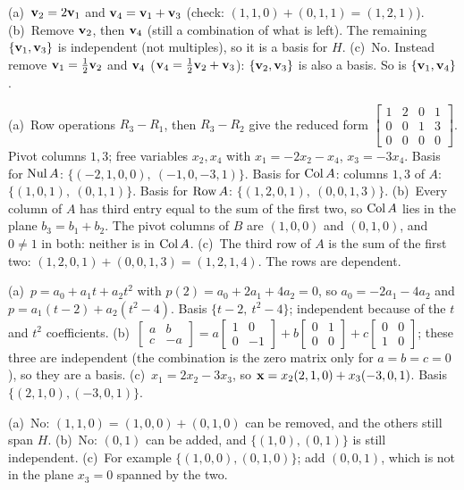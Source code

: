 \documentclass[11pt]{article}
\begin{document}
\begin{description}[leftmargin=0pt,itemsep=5pt]
  \item[Knowledge Check \ref{kc:shrinkkc}.] (a)~$\mathbf{v}_2=2\mathbf{v}_1$ and $\mathbf{v}_4=\mathbf{v}_1+\mathbf{v}_3$ (check: $(1,1,0)+(0,1,1)=(1,2,1)$). (b)~Remove $\mathbf{v}_2$, then $\mathbf{v}_4$ (still a combination of what is left). The remaining $\{\mathbf{v}_1,\mathbf{v}_3\}$ is independent (not multiples), so it is a basis for $H$. (c)~No. Instead remove $\mathbf{v}_1=\tfrac12\mathbf{v}_2$ and $\mathbf{v}_4$ ($\mathbf{v}_4=\tfrac12\mathbf{v}_2+\mathbf{v}_3$): $\{\mathbf{v}_2,\mathbf{v}_3\}$ is also a basis. So is $\{\mathbf{v}_1,\mathbf{v}_4\}$.
  \item[Knowledge Check \ref{kc:nulcolrow}.] (a)~Row operations $R_3-R_1$, then $R_3-R_2$ give the reduced form $\begin{bmatrix}1&2&0&1\\0&0&1&3\\0&0&0&0\end{bmatrix}$. Pivot columns $1,3$; free variables $x_2,x_4$ with $x_1=-2x_2-x_4$, $x_3=-3x_4$. Basis for $\operatorname{Nul} A$: $\{(-2,1,0,0),\ (-1,0,-3,1)\}$. Basis for $\operatorname{Col} A$: columns $1,3$ of $A$: $\{(1,0,1),\ (0,1,1)\}$. Basis for $\operatorname{Row} A$: $\{(1,2,0,1),\ (0,0,1,3)\}$. (b)~Every column of $A$ has third entry equal to the sum of the first two, so $\operatorname{Col} A$ lies in the plane $b_3=b_1+b_2$. The pivot columns of $B$ are $(1,0,0)$ and $(0,1,0)$, and $0\neq1$ in both: neither is in $\operatorname{Col} A$. (c)~The third row of $A$ is the sum of the first two: $(1,2,0,1)+(0,0,1,3)=(1,2,1,4)$. The rows are dependent.
  \item[Knowledge Check \ref{kc:cond}.] (a)~$p=a_0+a_1t+a_2t^2$ with $p(2)=a_0+2a_1+4a_2=0$, so $a_0=-2a_1-4a_2$ and $p=a_1(t-2)+a_2(t^2-4)$. Basis $\{t-2,\ t^2-4\}$; independent because of the $t$ and $t^2$ coefficients. (b)~$\begin{bmatrix}a&b\\c&-a\end{bmatrix}=a\begin{bmatrix}1&0\\0&-1\end{bmatrix}+b\begin{bmatrix}0&1\\0&0\end{bmatrix}+c\begin{bmatrix}0&0\\1&0\end{bmatrix}$; these three are independent (the combination is the zero matrix only for $a=b=c=0$), so they are a basis. (c)~$x_1=2x_2-3x_3$, so $\mathbf{x}=x_2(2,1,0)+x_3(-3,0,1)$. Basis $\{(2,1,0),(-3,0,1)\}$.
  \item[Knowledge Check \ref{kc:twoviews}.] (a)~No: $(1,1,0)=(1,0,0)+(0,1,0)$ can be removed, and the others still span $H$. (b)~No: $(0,1)$ can be added, and $\{(1,0),(0,1)\}$ is still independent. (c)~For example $\{(1,0,0),(0,1,0)\}$; add $(0,0,1)$, which is not in the plane $x_3=0$ spanned by the two.

\end{description}
\end{document}
